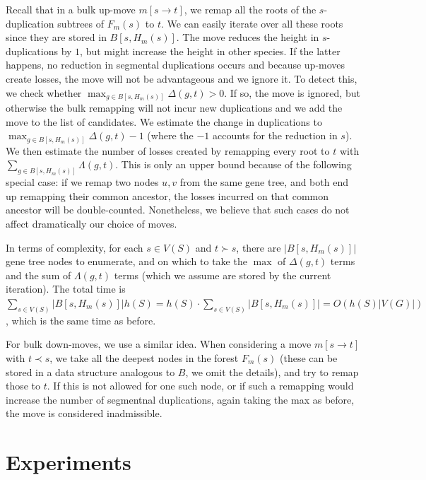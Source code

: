 \documentclass[10pt]{article}
\begin{document}
Recall that in a bulk up-move $m[s \rightarrow t]$, we remap all the roots of the $s$-duplication subtrees of $F_m(s)$ to $t$.  
We can easily iterate over all these roots since they are stored in $B[s, H_m(s)]$.  The move reduces the height in $s$-duplications by $1$, but might increase the height in other species.
If the latter happens, no reduction in segmental duplications occurs and because up-moves create losses, the move will not be advantageous and we ignore it.  To detect this, we check whether $\max_{g \in B[s, H_m(s)]} \Delta(g, t) > 0$.  If so, the move is ignored, but otherwise the bulk remapping will not incur new duplications and we add the move to the list of candidates.  We estimate the change in duplications to  $\max_{g \in B[s, H_m(s)]} \Delta(g, t) - 1$ (where the $-1$ accounts for the reduction in $s$).
We then estimate the number of losses created by remapping every root to $t$ with $\sum_{g \in B[s, H_m(s)]} \Lambda(g, t)$.  
This is only an upper bound because of the following special case: if we remap two nodes $u, v$ from the same gene tree, and both end up remapping their common ancestor, the losses incurred on that common ancestor will be double-counted.  Nonetheless, we believe that such cases do not affect dramatically our choice of moves.

In terms of complexity, for each $s \in V(S)$ and $t \succ s$, there are $|B[s, H_m(s)]|$ gene tree nodes to enumerate, and on which to take the $\max$ of $\Delta(g, t)$ terms and the sum of $\Lambda(g, t)$ terms (which we assume are stored by the current iteration).  The total time is $\sum_{s \in V(S)}|B[s, H_m(s)]| h(S) = h(S) \cdot \sum_{s \in V(S)}|B[s, H_m(s)]| = O(h(S) |V(G)|)$, which is the same time as before.

For bulk down-moves, we use a similar idea.  When considering a move $m[s \rightarrow t]$ with $t \prec s$, we take all the deepest nodes in the forest $F_m(s)$ (these can be stored in a data structure analogous to $B$, we omit the details), and try to remap those to $t$.  If this is not allowed for one such node, or if such a remapping would increase the number of segmentnal duplications, again taking the max as before, the move is considered inadmissible.





\section{Experiments}
\end{document}
